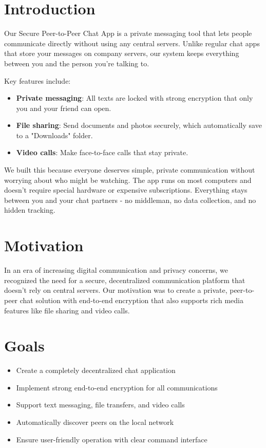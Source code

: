 \documentclass{article}
\begin{document}
\vspace*{2cm} %

\maketitle

\section*{Introduction}

Our Secure Peer-to-Peer Chat App is a private messaging tool that lets people communicate directly without using any central servers. Unlike regular chat apps that store your messages on company servers, our system keeps everything between you and the person you're talking to.

Key features include:

\begin{itemize}
    \item \textbf{Private messaging}: All texts are locked with strong encryption that only you and your friend can open.
    \item \textbf{File sharing}: Send documents and photos securely, which automatically save to a "Downloads" folder.
    \item \textbf{Video calls}: Make face-to-face calls that stay private.
\end{itemize}

We built this because everyone deserves simple, private communication without worrying about who might be watching. The app runs on most computers and doesn't require special hardware or expensive subscriptions. Everything stays between you and your chat partners - no middleman, no data collection, and no hidden tracking.

\section*{Motivation}
In an era of increasing digital communication and privacy concerns, we recognized the need for a secure, decentralized communication platform that doesn't rely on central servers. Our motivation was to create a private, peer-to-peer chat solution with end-to-end encryption that also supports rich media features like file sharing and video calls.

\section*{Goals}
\begin{itemize}
    \item Create a completely decentralized chat application
    \item Implement strong end-to-end encryption for all communications
    \item Support text messaging, file transfers, and video calls
    \item Automatically discover peers on the local network
    \item Ensure user-friendly operation with clear command interface
\end{itemize}
\end{document}
